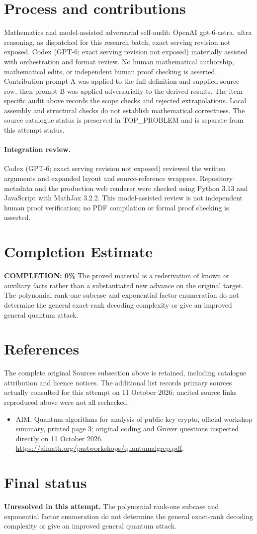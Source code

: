 \documentclass[11pt]{article}
\begin{document}
\section{Process and contributions}
Mathematics and model-assisted adversarial self-audit: OpenAI gpt-6-astra, ultra reasoning, as dispatched for this research batch; exact serving revision not exposed. Codex (GPT-6; exact serving revision not exposed) materially assisted with orchestration and format review. No human mathematical authorship, mathematical edits, or independent human proof checking is asserted.
Contribution prompt A was applied to the full definition and supplied source row, then prompt B was applied adversarially to the derived results. The item-specific audit above records the scope checks and rejected extrapolations. Local assembly and structural checks do not establish mathematical correctness. The source catalogue status is preserved in TOP\_PROBLEM and is separate from this attempt status.
\paragraph{Integration review.} Codex (GPT-6; exact serving revision not exposed) reviewed the written arguments and expanded layout and source-reference wrappers. Repository metadata and the production web renderer were checked using Python 3.13 and JavaScript with MathJax 3.2.2. This model-assisted review is not independent human proof verification; no PDF compilation or formal proof checking is asserted.

\section{Completion Estimate}
\noindent\textbf{COMPLETION: 0\%}
The proved material is a rederivation of known or auxiliary facts rather than a substantiated new advance on the original target. The polynomial rank-one subcase and exponential factor enumeration do not determine the general exact-rank decoding complexity or give an improved general quantum attack.
\section{References}
The complete original Sources subsection above is retained, including catalogue attribution and licence notices. The additional list records primary sources actually consulted for this attempt on 11 October 2026; uncited source links reproduced above were not all rechecked.
\begin{itemize}
\item AIM, Quantum algorithms for analysis of public-key crypto, official workshop summary, printed page 3; original coding and Grover questions inspected directly on 11 October 2026. \url{https://aimath.org/pastworkshops/quantumalgrep.pdf}.
\end{itemize}
\section{Final status}
\textbf{Unresolved in this attempt.} The polynomial rank-one subcase and exponential factor enumeration do not determine the general exact-rank decoding complexity or give an improved general quantum attack.
\end{document}
